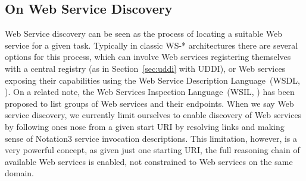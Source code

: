 \documentclass[runningheads,a4paper, twocolumn]{llncs}
\begin{document}
\subsection{On Web Service Discovery}
Web Service discovery can be seen as the process of locating a suitable Web service for a given task. Typically in classic WS-* architectures there are several options for this process, which can involve Web services registering themselves with a central registry (as in Section~\ref{sec:uddi} with UDDI), or Web services exposing their capabilities using the Web Service Description Language~(WSDL, \cite{WSDL1, WSDL2}). On a related note, the Web Services Inspection Language~(WSIL, \cite{WSIL}) has been proposed to list groups of Web services and their endpoints. When we say Web service discovery, we currently limit ourselves to enable discovery of Web services by following ones nose from a given start URI by resolving links and making sense of Notation3 service invocation descriptions. This limitation, however, is a very powerful concept, as given just one starting URI, the full reasoning chain of available Web services is enabled, not constrained to Web services on the same domain.
\end{document}
